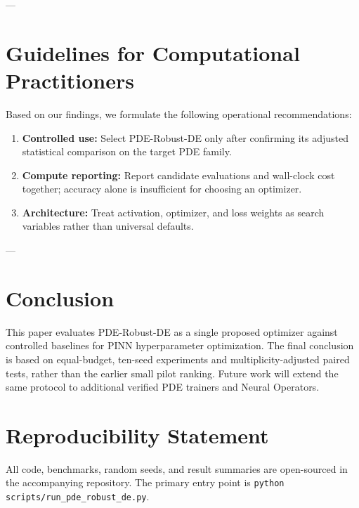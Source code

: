 \documentclass[authoryear,preprint,12pt]{elsarticle}
\begin{document}
---

\section{Guidelines for Computational Practitioners}
\label{sec:guidelines}
Based on our findings, we formulate the following operational recommendations:
\begin{enumerate}
    \item \textbf{Controlled use:} Select PDE-Robust-DE only after confirming its adjusted statistical comparison on the target PDE family.
    \item \textbf{Compute reporting:} Report candidate evaluations and wall-clock cost together; accuracy alone is insufficient for choosing an optimizer.
    \item \textbf{Architecture:} Treat activation, optimizer, and loss weights as search variables rather than universal defaults.
\end{enumerate}

---

\section{Conclusion}
\label{sec:conclusion}
This paper evaluates PDE-Robust-DE as a single proposed optimizer against controlled baselines for PINN hyperparameter optimization. The final conclusion is based on equal-budget, ten-seed experiments and multiplicity-adjusted paired tests, rather than the earlier small pilot ranking. Future work will extend the same protocol to additional verified PDE trainers and Neural Operators.

\section*{Reproducibility Statement}
All code, benchmarks, random seeds, and result summaries are open-sourced in the accompanying repository. The primary entry point is \texttt{python scripts/run\_pde\_robust\_de.py}.



\end{document}
